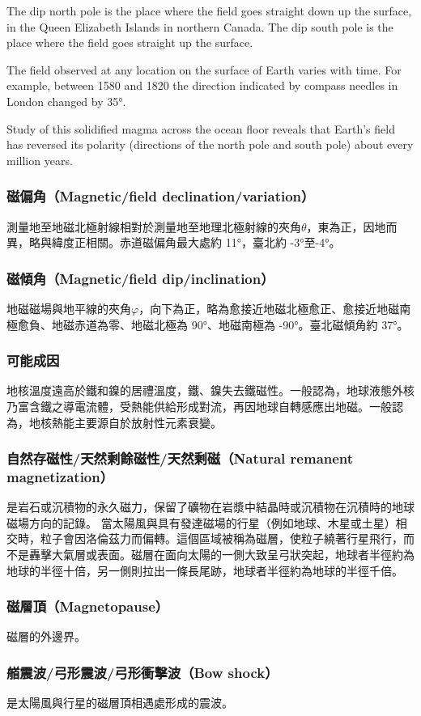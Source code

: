 \documentclass[a4paper,12pt]{report}
\begin{document}
\begin{itemize}
The dip north pole is the place where the field goes straight down up the surface, in the Queen Elizabeth Islands in northern Canada. The dip south pole is the place where the field goes straight up the surface.

The field observed at any location on the surface of Earth varies with time. For example, between 1580 and 1820 the direction indicated by compass needles in London changed by 35°.

Study of this solidified magma across the ocean floor reveals that Earth's field has reversed its polarity (directions of the north pole and south pole) about every million years.
\subsubsection{磁偏角（Magnetic/field declination/variation）}
測量地至地磁北極射線相對於測量地至地理北極射線的夾角$\theta$，東為正，因地而異，略與緯度正相關。赤道磁偏角最大處約 11°，臺北約 -3°至-4°。
\subsubsection{磁傾角（Magnetic/field dip/inclination） }
地磁磁場與地平線的夾角$\varphi$，向下為正，略為愈接近地磁北極愈正、愈接近地磁南極愈負、地磁赤道為零、地磁北極為 90°、地磁南極為 -90°。臺北磁傾角約 37°。
\subsubsection{可能成因}
地核溫度遠高於鐵和鎳的居禮溫度，鐵、鎳失去鐵磁性。一般認為，地球液態外核乃富含鐵之導電流體，受熱能供給形成對流，再因地球自轉感應出地磁。一般認為，地核熱能主要源自於放射性元素衰變。
\subsubsection{自然存磁性/天然剩餘磁性/天然剩磁（Natural remanent magnetization）}
是岩石或沉積物的永久磁力，保留了礦物在岩漿中結晶時或沉積物在沉積時的地球磁場方向的記錄。
當太陽風與具有發達磁場的行星（例如地球、木星或土星）相交時，粒子會因洛倫茲力而偏轉。這個區域被稱為磁層，使粒子繞著行星飛行，而不是轟擊大氣層或表面。磁層在面向太陽的一側大致呈弓狀突起，地球者半徑約為地球的半徑十倍，另一側則拉出一條長尾跡，地球者半徑約為地球的半徑千倍。
\subsubsection{磁層頂（Magnetopause）}
磁層的外邊界。
\subsubsection{艏震波/弓形震波/弓形衝擊波（Bow shock）}
是太陽風與行星的磁層頂相遇處形成的震波。

\end{itemize}
\end{document}
